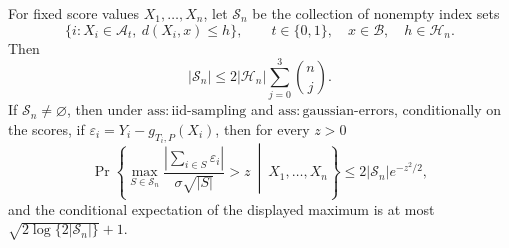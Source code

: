 For fixed score values \(X_1,\ldots,X_n\), let \(\mathscr S_n\) be the collection of nonempty index sets
\[
 \{i:X_i\in\mathcal A_t,\ d(X_i,x)\le h\},\qquad t\in\{0,1\},\quad x\in\mathcal B,\quad h\in\mathcal H_n.
\]
Then
\[
 |\mathscr S_n|\le 2|\mathcal H_n|\sum_{j=0}^3\binom nj.
\]
If \(\mathscr S_n\ne\varnothing\), then under \(\mathrm{ass:iid\text{-}sampling}\) and \(\mathrm{ass:gaussian\text{-}errors}\), conditionally on the scores, if \(\varepsilon_i=Y_i-g_{T_i,P}(X_i)\), then for every \(z>0\)
\[
 \Pr\left\{\max_{S\in\mathscr S_n}\frac{|\sum_{i\in S}\varepsilon_i|}{\sigma\sqrt{|S|}}>z\ \middle|\ X_1,\ldots,X_n\right\}
 \le2|\mathscr S_n|e^{-z^2/2},
\]
and the conditional expectation of the displayed maximum is at most \(\sqrt{2\log\{2|\mathscr S_n|\}}+1\).